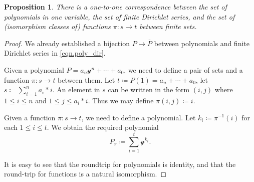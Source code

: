 \documentclass[11pt, article, one side]{memoir}
\theoremstyle{theorem}
\newtheorem{proposition}[equation]{Proposition}
\theoremstyle{definition}
\theoremstyle{remark}
\newcommand{\inv}{^{-1}}
\newcommand{\yon}{\mathcal{y}}
\begin{document}
\begin{proposition}\label{prop.poly_function}
There is a one-to-one correspondence between the set of polynomials in one variable, the set of finite Dirichlet series, and the set of (isomorphism classes of) functions $\pi\colon s\to t$ between finite sets.
\end{proposition}
\begin{proof}
We already established a bijection $P\mapsto\overline{P}$ between polynomials and finite Dirichlet series in \cref{eqn.poly_dir}.

Given a polynomial $P=a_n\yon^n+\cdots+a_0$, we need to define a pair of sets and a function $\pi\colon s\to t$ between them. Let $t\coloneqq P(1)=a_n+\cdots+a_0$, let $s\coloneqq\sum_{i=1}^na_i*i$. An element in $s$ can be written in the form $(i,j)$ where $1\leq i\leq n$ and $1\leq j\leq a_i*i$. Thus we may define $\pi(i,j)\coloneqq i$.

Given a function $\pi\colon s\to t$, we need to define a polynomial. Let $k_i\coloneqq\pi\inv(i)$ for each $1\leq i\leq t$. We obtain the required polynomial
\begin{equation}\label{eqn.Ppi}
	P_\pi\coloneqq\sum_{i=1}^{t}\yon^{k_i}.
\end{equation}

It is easy to see that the roundtrip for polynomials is identity, and that the round-trip for functions is a natural isomorphism.
\end{proof}
\end{document}
